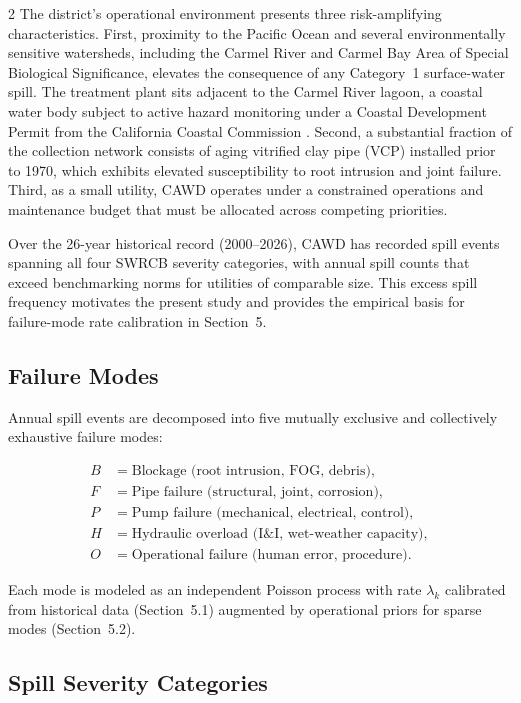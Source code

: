 \documentclass[10pt]{article}
\begin{document}
\begin{multicols}{2}
The district's operational environment presents three risk-amplifying
characteristics. First, proximity to the Pacific Ocean and several
environmentally sensitive watersheds, including the Carmel River and
Carmel Bay Area of Special Biological Significance, elevates the
consequence of any Category~1 surface-water spill. The treatment plant
sits adjacent to the Carmel River lagoon, a coastal water body subject
to active hazard monitoring under a Coastal Development Permit from the
California Coastal Commission \citep{cawd_hazards2025}. Second, a
substantial fraction of the collection network consists of aging vitrified
clay pipe (VCP) installed prior to 1970, which exhibits elevated
susceptibility to root intrusion and joint failure. Third, as a small
utility, CAWD operates under a constrained operations and maintenance
budget that must be allocated across competing priorities.
 
Over the 26-year historical record (2000--2026), CAWD has recorded spill
events spanning all four SWRCB severity categories, with annual spill
counts that exceed benchmarking norms for utilities of comparable size.
This excess spill frequency motivates the present study and provides the
empirical basis for failure-mode rate calibration in Section~5.
 
\subsection{Failure Modes}
 
Annual spill events are decomposed into five mutually exclusive and
collectively exhaustive failure modes:
 
\begin{align*}
B &= \text{Blockage (root intrusion, FOG, debris)}, \\
F &= \text{Pipe failure (structural, joint, corrosion)}, \\
P &= \text{Pump failure (mechanical, electrical, control)}, \\
H &= \text{Hydraulic overload (I\&I, wet-weather capacity)}, \\
O &= \text{Operational failure (human error, procedure)}.
\end{align*}
 
Each mode is modeled as an independent Poisson process with rate
$\lambda_k$ calibrated from historical data (Section~5.1) augmented by
operational priors for sparse modes (Section~5.2).
 
\subsection{Spill Severity Categories}
 

\end{multicols}
\end{document}
